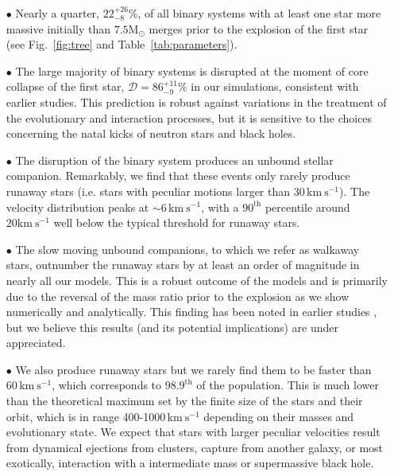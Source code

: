 \documentclass{aa}
\newcommand{\kms}{{\mathrm{km\ s^{-1}}}}
\newcommand{\Msun}{{\mathrm{M}_\odot}}
\DeclareRobustCommand{\Figref}[1]{Fig.~\ref{#1}}
\DeclareRobustCommand{\Tabref}[1]{Table~\ref{#1}}
\begin{document}
\begin{itemize}

\item[$\bullet$] Nearly a quarter,   $22_{-8}^{+26}$\%, of all binary
  systems with at least one star more massive initially than
  $7.5\Msun$ merges prior to the explosion of the first star (see \Figref{fig:tree} and \Tabref{tab:parameters}).

\item[$\bullet$] The large majority of binary systems is disrupted at the moment of core collapse of the first star, $\mathcal{D}=86_{-9}^{+11}\%$ in our simulations, consistent with earlier studies. This prediction is robust against variations in the treatment of the evolutionary and interaction processes, but it is sensitive to the choices concerning the natal kicks of neutron stars and black holes.  

\item[$\bullet$] The disruption of the binary system produces an
  unbound stellar companion. Remarkably, we find that these events
  only rarely produce runaway stars (i.e. stars with peculiar motions
  larger than $30\,\kms$).  The velocity distribution peaks at
  $\sim6\,\mathrm{km\  s^{-1}}$, with a $90^\mathrm{th}$ percentile
  around $20\kms$ well below the typical threshold for runaway stars.  

\item[$\bullet$] The slow moving unbound companions, to which we refer
  as walkaway stars, outnumber the runaway stars by at least an order
  of magnitude in nearly all our models. This is a robust outcome of
  the models and is primarily due to the reversal of the mass ratio
  prior to the explosion as we show numerically and analytically.
  This finding has been noted in earlier studies \citep[e.g., ][]{dedonder:97,eldridge:11},  but we believe this results (and its potential implications) are under appreciated.  

\item[$\bullet$] We also produce runaway stars but we rarely find them
  to be faster than $60\,\kms$, which corresponds to
  $98.9^\mathrm{th}$ of the population. This is much lower than the
  theoretical maximum set by the finite size of the stars and their
  orbit, which is in range 400-1000$\,\kms$ depending on their masses
  and evolutionary state. We expect that stars with larger peculiar
  velocities result from dynamical ejections from clusters, capture
  from another galaxy, or most exotically, interaction with a
  intermediate mass or supermassive black hole.
    

\end{itemize}
\end{document}
